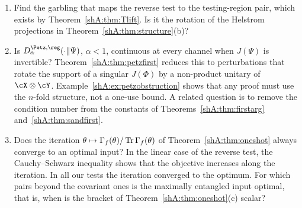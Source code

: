 \begin{enumerate}[leftmargin=1.5em]
\item Find the garbling that maps the reverse test to the testing-region pair, which exists by Theorem~\ref{shA:thm:Tlift}. Is it the rotation of the Helstrom projections in Theorem~\ref{shA:thm:structure}(b)?
\item Is $D^{\Petz,\reg}_\alpha(\cdot\|\Psi)$, $\alpha<1$, continuous at every channel when $J(\Psi)$ is invertible? Theorem~\ref{shA:thm:petzfirst} reduces this to perturbations that rotate the support of a singular $J(\Phi)$ by a non-product unitary of $\cX\otimes\cY$. Example~\ref{shA:ex:petzobstruction} shows that any proof must use the $n$-fold structure, not a one-use bound. A related question is to remove the condition number from the constants of Theorems~\ref{shA:thm:firstarg} and~\ref{shA:thm:sandfirst}.
\item Does the iteration $\theta\mapsto\Gamma_f(\theta)/\operatorname{Tr}\Gamma_f(\theta)$ of Theorem~\ref{shA:thm:oneshot} always converge to an optimal input? In the linear case of the reverse test, the Cauchy--Schwarz inequality shows that the objective increases along the iteration. In all our tests the iteration converged to the optimum. For which pairs beyond the covariant ones is the maximally entangled input optimal, that is, when is the bracket of Theorem~\ref{shA:thm:oneshot}(c) scalar?
\end{enumerate}

\endgroup
